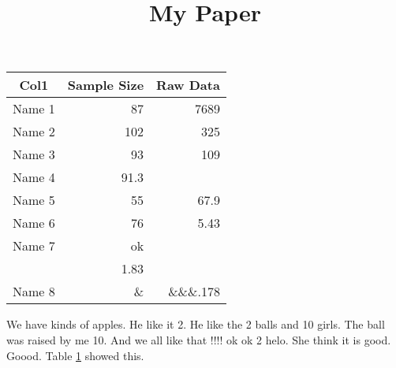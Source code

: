 \documentclass{article}
\begin{document}
\title{My Paper}
  \begin{table}[!htb]
    \centering
    \begin{tabular}{rrr}
      \multicolumn{1}{c}{\textbf{Col1}} & \textbf{Sample Size} & \textbf{Raw Data} \\ \hline
      Name 1 & 87 & 7689 \\
      Name 2 & 102 & 325 \\
      Name 3 & 93 & 109 \\
      Name 4 &  91.3 \\
      Name 5 & 55 & 67.9 \\
      Name 6 & 76 & 5.43 \\
      Name 7 & ok\\ & 1.83 \\
      Name 8 & \& & \&\&\&.178 \\ \hline
    \end{tabular}
    \label{tab:data}
  \end{table}
  We have kinds of apples. He like it 2.
                 He like the 2 balls and 10 girls.           The ball was raised by me 10. And we all like that !!!! ok ok 2 helo.
  She think it is good. Goood.
  Table \ref{tab:data} showed this.
\end{document}
